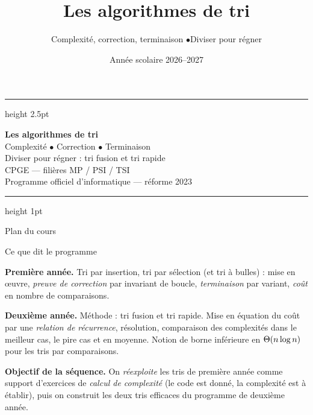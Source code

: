 \documentclass[11pt,aspectratio=169]{beamer}
\title{Les algorithmes de tri}
\subtitle{Complexité, correction, terminaison \quad$\bullet$\quad Diviser pour régner}
\date{Année scolaire 2026--2027}
\author{}
\institute{}
\begin{document}
\begin{frame}[plain]
  \vfill
  \begin{center}
    {\color{teal}\hrule height 2.5pt}\vspace{12pt}
    {\Huge\bfseries\color{teal} Les algorithmes de tri}\\[10pt]
    {\large Complexité \;$\bullet$\; Correction \;$\bullet$\; Terminaison}\\[6pt]
    {\large Diviser pour régner : tri fusion et tri rapide}\\[14pt]
    {\normalsize CPGE --- filières MP / PSI / TSI}\\[4pt]
    {\footnotesize Programme officiel d'informatique --- réforme 2023}\\[10pt]
    {\color{teal}\hrule height 1pt}
  \end{center}
  \vfill
\end{frame}

\begin{frame}{Plan du cours}
  \tableofcontents
\end{frame}

\begin{frame}{Ce que dit le programme}
\begin{encadre}
\small
\textbf{Première année.} Tri par insertion, tri par sélection (et tri à bulles) :
mise en \oe uvre, \emph{preuve de correction} par invariant de boucle,
\emph{terminaison} par variant, \emph{coût} en nombre de comparaisons.
\end{encadre}
\vspace{4pt}
\begin{encadre}
\small
\textbf{Deuxième année.} Méthode  : tri fusion et tri rapide.
Mise en équation du coût par une \emph{relation de récurrence}, résolution,
comparaison des complexités dans le meilleur cas, le pire cas et en moyenne.
Notion de borne inférieure en $\Theta(n\log n)$ pour les tris par comparaisons.
\end{encadre}
\vspace{6pt}
\begin{attention}
\small
\textbf{Objectif de la séquence.} On \emph{réexploite} les tris de première année comme
support d'exercices de \emph{calcul de complexité} (le code est donné, la complexité est
à établir), puis on construit les deux tris efficaces du programme de deuxième année.
\end{attention}
\end{frame}
\end{document}
